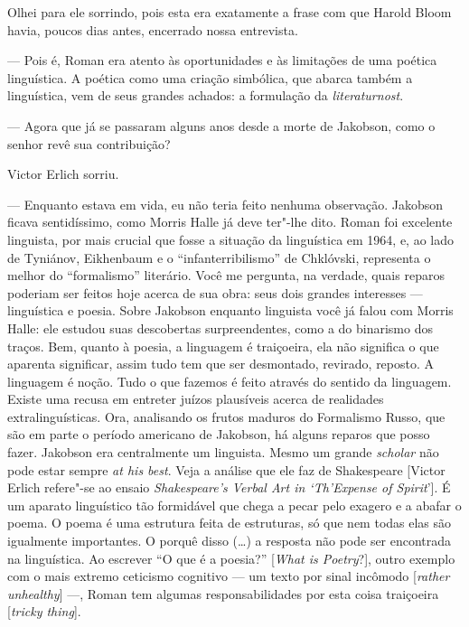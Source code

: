 {{{Olhei para ele sorrindo, pois esta era exatamente a frase com que Harold
Bloom havia, poucos dias antes, encerrado nossa entrevista.

--- Pois é, Roman era atento às oportunidades e às limitações de uma
poética linguística. A poética como uma criação simbólica, que abarca
também a linguística, vem de seus grandes achados: a formulação da
\emph{literaturnost}.

--- Agora que já se passaram alguns anos desde a morte de Jakobson, como o
senhor revê sua contribuição?

Victor Erlich sorriu.

--- Enquanto estava em vida, eu não teria feito nenhuma observação.
Jakobson ficava sentidíssimo, como Morris Halle já deve ter"-lhe dito.
Roman foi excelente linguista, por mais crucial que fosse a situação da
linguística em 1964, e, ao lado de Tyniánov, Eikhenbaum e o
``infanterribilismo'' de Chklóvski, representa o melhor do
``formalismo'' literário. Você me pergunta, na verdade, quais reparos poderiam ser feitos
hoje acerca de sua obra: seus dois grandes interesses --- linguística e
poesia. Sobre Jakobson enquanto linguista você já falou com Morris Halle: ele
estudou suas descobertas surpreendentes, como a do binarismo dos traços.
Bem, quanto à poesia, a linguagem é traiçoeira, ela não significa o que
aparenta significar, assim tudo tem que ser desmontado, revirado,
reposto. A linguagem é noção. Tudo o que fazemos é feito através do sentido da
linguagem. Existe uma recusa em entreter juízos plausíveis acerca de
realidades extralinguísticas. Ora, analisando os frutos maduros do Formalismo Russo, que são em parte
o período americano de Jakobson, há alguns reparos que posso fazer.
 Jakobson era centralmente um linguista. Mesmo um grande \emph{scholar} não pode
estar sempre \emph{at his best}.
Veja a análise que ele faz de Shakespeare [Victor Erlich
 refere"-se ao ensaio \emph{Shakespeare's Verbal Art in `Th'Expense of
 Spirit}']. É um aparato linguístico tão formidável que chega a
pecar pelo exagero e a abafar o poema. O poema é uma estrutura feita de
estruturas, só que nem todas elas são igualmente importantes. O porquê
disso (\ldots{}) a resposta não pode ser encontrada na linguística.
 Ao escrever ``O que é a poesia?'' [\emph{What is
 Poetry}?], outro exemplo com o mais extremo
ceticismo cognitivo --- um texto por sinal incômodo [\emph{rather
unhealthy}] ---, Roman tem algumas responsabilidades por esta coisa
traiçoeira [\emph{tricky thing}].

}}}

